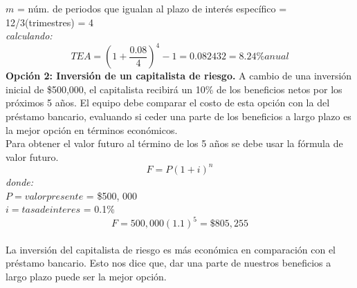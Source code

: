 \documentclass[letterpaper,12pt]{article}
\begin{document}
\begin{sloppypar}
\begin{itemize}
    $m$ = núm. de periodos que igualan al plazo de interés específico = 12/3(trimestres) = 4
    \vspace{0.3cm}\\
    \textit{calculando:}
    $$TEA = \left(1 +\frac{0.08}{4}\right) ^{4} - 1 = 0.082432 = 8.24\% anual$$
    \newpage
    \textbf{Opción 2: Inversión de un capitalista de riesgo.} A cambio de una inversión inicial de \$500,000, el capitalista recibirá un 10\% de los beneficios netos por los próximos 5 años. El equipo debe comparar el costo de esta opción con la del préstamo bancario, evaluando si ceder una parte de los beneficios a largo plazo es la mejor opción en términos económicos. 
    \vspace{0.3cm}\\ 
    Para obtener el valor futuro al término de los 5 años se debe usar la fórmula de valor futuro.
    $$F = P (1 + i)^{n}$$
    \textit{donde:}\\ 
    $P = valor presente$ = \$500, 000
    \vspace{0.3cm}\\ 
    $i = tasa de interes$  = 0.1\%
    $$F = 500,000 (1.1)^{5} = \$805,255$$
    \vspace{0.3cm}\\ 
    La inversión del capitalista de riesgo es más económica en comparación con el préstamo bancario. Esto nos dice que, dar una parte de nuestros beneficios a largo plazo puede ser la mejor opción.
    

\end{itemize}
\end{sloppypar}
\end{document}
